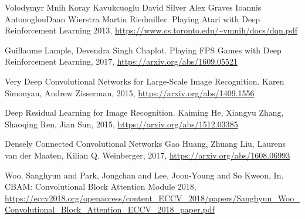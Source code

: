 \documentclass[10pt,a4paper]{article}
\begin{document}
\newpage
\begin{thebibliography}{9}

Volodymyr Mnih   Koray Kavukcuoglu   David Silver   Alex Graves   Ioannis AntonoglouDaan Wierstra   Martin Riedmiller.
Playing Atari with Deep Reinforcement Learning 2013, \url{https://www.cs.toronto.edu/~vmnih/docs/dqn.pdf}

Guillaume Lample, Devendra Singh Chaplot.
Playing FPS Games with Deep Reinforcement Learning, 2017, \url{https://arxiv.org/abs/1609.05521}

Very Deep Convolutional Networks for Large-Scale Image Recognition.
Karen Simonyan, Andrew Zisserman, 2015, \url{https://arxiv.org/abs/1409.1556}

Deep Residual Learning for Image Recognition.
Kaiming He, Xiangyu Zhang, Shaoqing Ren, Jian Sun, 2015, \url{https://arxiv.org/abs/1512.03385}

Densely Connected Convolutional Networks
Gao Huang, Zhuang Liu, Laurens van der Maaten, Kilian Q. Weinberger, 2017, \url{https://arxiv.org/abs/1608.06993}


Woo, Sanghyun and Park, Jongchan and Lee, Joon-Young and So Kweon, In.
CBAM: Convolutional Block Attention Module 2018, \url{https://eccv2018.org/openaccess/content_ECCV_2018/papers/Sanghyun_Woo_Convolutional_Block_Attention_ECCV_2018_paper.pdf}


\end{thebibliography}
\end{document}

